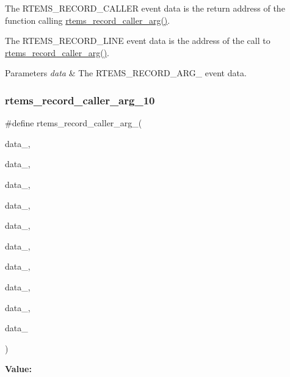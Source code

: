 The R\+T\+E\+M\+S\+\_\+\+R\+E\+C\+O\+R\+D\+\_\+\+C\+A\+L\+L\+ER event data is the return address of the function calling \mbox{\hyperlink{group__RTEMSRecord_ga9f52499b07db2052cb3ed96e194c449b}{rtems\+\_\+record\+\_\+caller\+\_\+arg()}}.

The R\+T\+E\+M\+S\+\_\+\+R\+E\+C\+O\+R\+D\+\_\+\+L\+I\+NE event data is the address of the call to \mbox{\hyperlink{group__RTEMSRecord_ga9f52499b07db2052cb3ed96e194c449b}{rtems\+\_\+record\+\_\+caller\+\_\+arg()}}.


\begin{DoxyParams}{Parameters}
{\em data} & The R\+T\+E\+M\+S\+\_\+\+R\+E\+C\+O\+R\+D\+\_\+\+A\+R\+G\+\_ event data. \\
\hline
\end{DoxyParams}
\mbox{\label{group__RTEMSRecord_ga6ec65a3a626d178e21d386a68b87ef9f}} 
\subsubsection{\texorpdfstring{rtems\_record\_caller\_arg\_10}{rtems\_record\_caller\_arg\_10}}
{\footnotesize\ttfamily \#define rtems\+\_\+record\+\_\+caller\+\_\+arg\+\_(\begin{DoxyParamCaption}\item[{}]{data\+\_,  }\item[{}]{data\+\_,  }\item[{}]{data\+\_,  }\item[{}]{data\+\_,  }\item[{}]{data\+\_,  }\item[{}]{data\+\_,  }\item[{}]{data\+\_,  }\item[{}]{data\+\_,  }\item[{}]{data\+\_,  }\item[{}]{data\+\_ }\end{DoxyParamCaption})}

{\bfseries Value\+:}
\begin{DoxyCode}{0}
\DoxyCodeLine{  )}

\end{DoxyCode}


